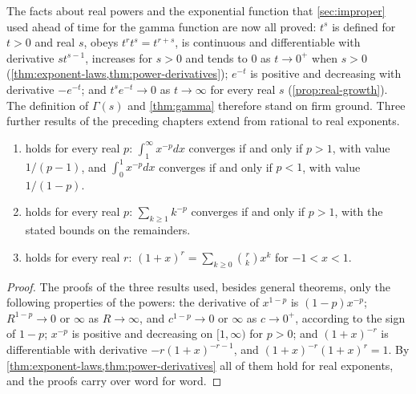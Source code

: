 The facts about real powers and the exponential function that \cref{sec:improper} used ahead of time for the gamma function are now all proved: $t^s$ is defined for $t>0$ and real $s$, obeys $t^rt^s=t^{r+s}$, is continuous and differentiable with derivative $st^{s-1}$, increases for $s>0$ and tends to $0$ as $t\to0^+$ when $s>0$ (\cref{thm:exponent-laws,thm:power-derivatives}); $e^{-t}$ is positive and decreasing with derivative $-e^{-t}$; and $t^se^{-t}\to0$ as $t\to\infty$ for every real $s$ (\cref{prop:real-growth}). The definition of $\Gamma(s)$ and \cref{thm:gamma} therefore stand on firm ground. Three further results of the preceding chapters extend from rational to real exponents.

\begin{corollary}
\label{cor:real-exponent-extensions}
\leavevmode
\begin{enumerate}
\item {} holds for every real $p$: $\int_1^\infty x^{-p}dx$ converges if and only if $p>1$, with value $1/(p-1)$, and $\int_0^1x^{-p}dx$ converges if and only if $p<1$, with value $1/(1-p)$.
\item {} holds for every real $p$: $\sum_{k\ge1}k^{-p}$ converges if and only if $p>1$, with the stated bounds on the remainders.
\item {} holds for every real $r$: $(1+x)^r=\sum_{k\ge0}\binom rkx^k$ for $-1<x<1$.
\end{enumerate}
\end{corollary}

\begin{proof}
The proofs of the three results used, besides general theorems, only the following properties of the powers: the derivative of $x^{1-p}$ is $(1-p)x^{-p}$; $R^{1-p}\to0$ or $\infty$ as $R\to\infty$, and $c^{1-p}\to0$ or $\infty$ as $c\to0^+$, according to the sign of $1-p$; $x^{-p}$ is positive and decreasing on $[1,\infty)$ for $p>0$; and $(1+x)^{-r}$ is differentiable with derivative $-r(1+x)^{-r-1}$, and $(1+x)^{-r}(1+x)^r=1$. By \cref{thm:exponent-laws,thm:power-derivatives} all of them hold for real exponents, and the proofs carry over word for word.
\end{proof}

